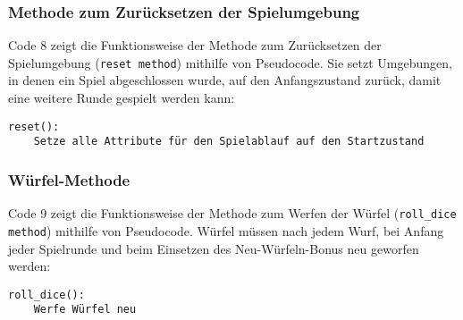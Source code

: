 \subsubsection{Methode zum Zurücksetzen der Spielumgebung}
\begin{minipage}{\linewidth}
Code 8 zeigt die Funktionsweise der Methode zum Zurücksetzen der Spielumgebung (\texttt{reset method}) mithilfe von Pseudocode. Sie setzt Umgebungen, in denen ein Spiel abgeschlossen wurde, auf den Anfangszustand zurück, damit eine weitere Runde gespielt werden kann:
\vspace{0.5cm}
\begin{lstlisting}[caption={Methode zum Zurücksetzen der Umgebung}]
reset():
	Setze alle Attribute für den Spielablauf auf den Startzustand
\end{lstlisting}
\end{minipage}

\subsubsection{Würfel-Methode}
\begin{minipage}{\linewidth}
Code 9 zeigt die Funktionsweise der Methode zum Werfen der Würfel (\texttt{roll\_dice method}) mithilfe von Pseudocode. Würfel müssen nach jedem Wurf, bei Anfang jeder Spielrunde und beim Einsetzen des Neu-Würfeln-Bonus neu geworfen werden:
\vspace{0.5cm}
\begin{lstlisting}[caption={Methode zum Werfen der Würfel}]
roll_dice():
	Werfe Würfel neu
\end{lstlisting}
\end{minipage}

